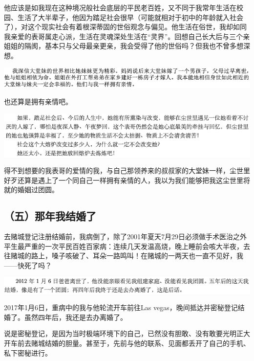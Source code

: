 \documentclass[9pt, b5paper]{article}
\begin{document}
他应该是如我现在这种境况般社会底层的平民老百姓，又不同于我常年生活在校园、生活了大半辈子，他因为踏足社会很早（可能就相对于初中的年龄就入社会了），对这个现实社会有着根深蒂固的世俗观念与偏见。他生活在俗世，我却如同我亲爱的表哥属走心派，生活在灵魂深处生活在“灵界”。回想自己长大后与三个亲姐姐的隔阂，基本只与父母最亲更亲，我会受得了他的世俗吗？但我也不曾多想深想。 

\begin{center}
\includegraphics[width=.9\linewidth]{./pic/backups_plans_20210423_211802.png}
\end{center}

也还算是拥有亲情吧。

\begin{center}
\includegraphics[width=.9\linewidth]{./pic/backups_plans_20210423_213157.png}
\end{center}

得不到想要的我表哥的爱情的我，与自己那领养来的叔叔家的大堂妹一样，尘世里好歹还算是遇上了一个同自己一样拥有亲情的人，我以为我们能够把我这尘世里将就的婚姻过团圆。

\subsection{（五）那年我结婚了}
\label{sec:orge9a1764}

去赌城登记注册结婚前，我病倒了，除了2001年夏天7月29日必须做手术医治之外平生最严重的一次平民百姓百家病：连续几天发温高烧，晚上睡前会咳大半夜，去往赌城的路上，嗓子咳破了、耳朵一路鸣叫！在赌城的一两天也一直不见好，我——快死了吗？

\begin{center}
\includegraphics[width=.9\linewidth]{./pic/backups_plans_20210423_213744.png}
\end{center}

2017年1月6日，重病中的我与他轮流开车前往Las vegas，晚间抵达并密秘登记结婚了。虽然四年后，我还是去办离婚了。

说是密秘登记，是因为当时极端环境下的自己，已然没有胆敢、没有敢要光明正大开车前去赌城结婚的胆量。甚至于，先前与他的联系、见面都丢开了自己的手机、私下密秘进行。
\end{document}
